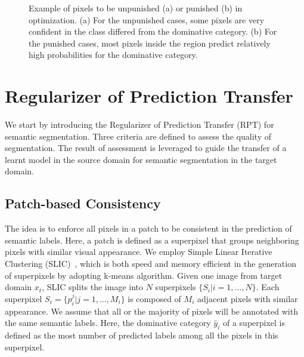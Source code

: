 \documentclass[10pt,twocolumn,letterpaper]{article}
\begin{document}
\begin{figure}[!tb]
   \caption{\small Example of pixels to be unpunished (a) or punished (b) in optimization. (a) For the unpunished cases, some pixels are very confident in the class differed from the dominative category. (b) For the punished cases, most pixels inside the region predict relatively high probabilities for the dominative category.}
   \label{fig:patch}
   \vspace{-0.15in}
\end{figure}
\section{Regularizer of Prediction Transfer}
We start by introducing the Regularizer of Prediction Transfer (RPT) for semantic segmentation.
Three criteria are defined to assess the quality of segmentation. The result of assessment is leveraged to guide the transfer of a learnt model in the source domain for semantic segmentation in the target domain.

\subsection{Patch-based Consistency}
The idea is to enforce all pixels in a patch to be consistent in the prediction of semantic labels. Here, a patch is defined as a superpixel that groups neighboring pixels with similar visual appearance. We employ Simple Linear Iterative Clustering (SLIC)~\cite{achanta2012slic}, which is both speed and memory efficient in the generation of superpixels by adopting k-means algorithm.
Given one image from target domain $x_t$, SLIC splits the image into $N$ superpixels $\{S_i|i=1,...,N\}$. Each superpixel $S_i=\{p^j_i|j=1,...,M_i\}$ is composed of $M_i$ adjacent pixels with similar appearance.
We assume that all or the majority of pixels will be annotated with the same semantic labels. Here, the dominative category $\hat{y}_i$ of a superpixel is defined as the most number of predicted labels among all the pixels in this superpixel.
\end{document}
